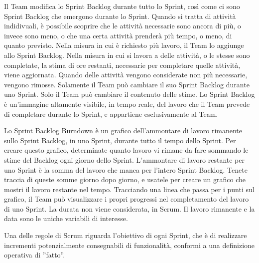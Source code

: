 Il Team modifica lo Sprint Backlog durante tutto lo Sprint, cos\`i come ci sono Sprint Backlog che emergono durante lo Sprint. Quando si tratta di attivit\`a indidivuali, \`e possibile scoprire che le attivit\`a necessarie sono ancora di pi\`u, o invece sono meno, o che una certa attivit\`a prender\`a pi\`u tempo, o meno, di quanto previsto. Nella misura in cui \`e richiesto pi\`u lavoro, il Team lo aggiunge allo Sprint Backlog. Nella misura in cui si lavora a delle attivit\`a, o le stesse sono completate, la stima di ore restanti, necessarie per completare quelle attivit\`a, viene aggiornata.  Quando delle attivit\`a vengono considerate non pi\`u necessarie, vengono rimosse. Solamente il Team pu\`o cambiare il suo Sprint Backlog durante uno Sprint. Solo il Team pu\`o cambiare il contenuto delle stime. Lo Sprint Backlog \`e un'immagine altamente visibile, in tempo reale, del lavoro che il Team prevede di completare durante lo Sprint, e appartiene esclusivamente al Team.

Lo Sprint Backlog Burndown \`e un grafico dell'ammontare di lavoro rimanente sullo Sprint Backlog, in uno Sprint, durante tutto il tempo dello Sprint. Per creare questo grafico, determinate quanto lavoro vi rimane da fare sommando le stime del Backlog ogni giorno dello Sprint. L'ammontare di lavoro restante per uno Sprint \`e la somma del lavoro che manca per l'intero Sprint Backlog. Tenete traccia di queste somme giorno dopo giorno, e usatele per creare un grafico che mostri il lavoro restante nel tempo. Tracciando una linea che passa per i punti sul grafico, il Team pu\`o visualizzare i propri progressi nel completamento del lavoro di uno Sprint. La durata non viene considerata, in Scrum. Il lavoro rimanente e la data sono le uniche variabili di interesse. 


Una delle regole di Scrum riguarda l'obiettivo di ogni Sprint, che \`e di realizzare incrementi potenzialmente consegnabili di funzionalit\`a, conformi a una definizione operativa di  ''fatto''.

\subsection*{\color{Blue}{FATTO}}
\label{sec:done}

